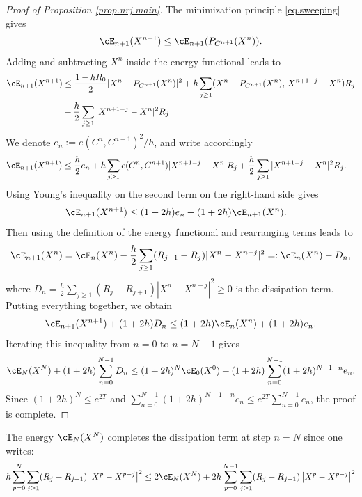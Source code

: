 \documentclass[]{jnsao}
\renewcommand{\tr}{R}
\begin{document}
 \begin{proof}[Proof of Proposition \ref{prop.nrj.main}]
 	The minimization principle \eqref{eq.sweeping} gives
 	\[
 	\cE_{n+1}(X^{n+1}) \le \cE_{n+1}(P_{C^{n+1}}(X^n)).
 	\]
 	Adding and subtracting $X^n$ inside the energy functional leads to
 	\[
 	\begin{aligned}
 		\cE_{n+1}(X^{n+1})
 		& \le \frac{1-h\tr_0}{2}
 		| X^n - P_{C^{n+1}}(X^n)|^2
 		+ h\sum_{j\ge1}( X^n - P_{C^{n+1}}(X^n),\,X^{n+1-j}-X^n)\tr_j \\
 		& + \frac{h}{2} \sum_{j\geq 1} | X^{n+1-j} - X^n|^2 \tr_j \\
 	\end{aligned}
 	\]
 	We denote $e_n:= e(C^n,C^{n+1})^2/h$, and write accordingly
 	\[
 	\begin{aligned}	
 		\cE_{n+1}(X^{n+1})
 		& \le \frac{h}{2} e_n 
 		+ h \sum_{j\ge1} e(C^n,C^{n+1})|X^{n+1-j}-X^n|\tr_j
 		+  \frac{h}{2} \sum_{j\geq 1} | X^{n+1-j} - X^n|^2 \tr_j .
 	\end{aligned}
 	\] 
 	Using Young's inequality on the second term on the right-hand side gives
 	\[
 	\begin{aligned}	
 		\cE_{n+1}(X^{n+1})
 		& \le (1+2 h ) e_n 
 		+ (1+2 h) \cE_{n+1}(X^n).		
 	\end{aligned}
 	\]
 	Then using the definition of the energy functional and rearranging terms leads to
 	\[	
 	\cE_{n+1}(X^n) = \cE_{n}(X^n) - \frac{h}{2} \sum_{j\ge1} (\tr_{j+1}-\tr_j) | X^{n} - X^{n-j}|^2 =: \cE_{n}(X^n) - D_n,
 	\]
 	where $D_n= \frac{h}{2} \sum_{j\ge1} (\tr_{j}-\tr_{j+1}) | X^{n} - X^{n-j}|^2 \geq 0$ is the dissipation term.
 	Putting everything together, we obtain
 	\[
 	\cE_{n+1}(X^{n+1}) + (1+2 h) D_n \le (1+2 h) \cE_{n}(X^n) + (1+2 h ) e_n.
 	\]
 	Iterating this inequality from $n=0$ to $n=N-1$ gives
 	\[
 	\cE_{N}(X^{N}) + (1+2 h) \sum_{n=0}^{N-1} D_n \le (1+2 h)^N \cE_{0}(X^0) + (1+2 h ) \sum_{n=0}^{N-1} (1+2 h)^{N-1-n} e_n.
 	\]
 	Since $(1+2 h)^N \le e^{2 T}$ and $\sum_{n=0}^{N-1} (1+2 h)^{N-1-n} e_n \le e^{2 T} \sum_{n=0}^{N-1} e_n$, the proof is complete.	
 \end{proof}
 
 \begin{remark}
 	The energy $\cE_{N}(X^N)$ completes the dissipation term at step $n=N$ since one writes:
 	$$
 	h \sum_{p=0}^N \sum_{j\geq1} (\tr_j - \tr_{j+1}) \left| X^{p}- X^{p-j}\right|^2 \leq 2 \cE_{N}(X^{N}) + 2 h\sum_{p=0}^{N-1} \sum_{j\geq1} (\tr_j - \tr_{j+1}) \left| X^{p}- X^{p-j}\right|^2  
 	$$
 \end{remark}
 
\end{document}
